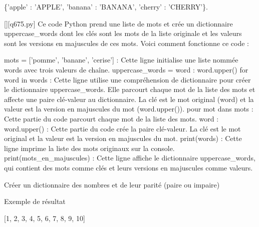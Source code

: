 \{'apple' : 'APPLE', 'banana' : 'BANANA', 'cherry' : 'CHERRY'\}.
        \par
        \begin{solution}
            \renewcommand{\nomfichier}{q675.py}
            \pythonfile{\chemincode \nomfichier}[][\nomfichier]
            Ce code Python prend une liste de mots et crée un dictionnaire uppercase_words dont les clés sont les mots de la liste originale et les valeurs sont les versions en majuscules de ces mots. Voici comment fonctionne ce code :

    mots = ['pomme', 'banane', 'cerise'] : Cette ligne initialise une liste nommée words avec trois valeurs de chaîne.
    uppercase_words = {word : word.upper() for word in words} : Cette ligne utilise une compréhension de dictionnaire pour créer le dictionnaire uppercase_words. Elle parcourt chaque mot de la liste des mots et affecte une paire clé-valeur au dictionnaire. La clé est le mot original (word) et la valeur est la version en majuscules du mot (word.upper()).
        pour mot dans mots : Cette partie du code parcourt chaque mot de la liste des mots.
        word : word.upper() : Cette partie du code crée la paire clé-valeur. La clé est le mot original et la valeur est la version en majuscules du mot.
    print(words) : Cette ligne imprime la liste des mots originaux sur la console.
    print(mots_en_majuscules) : Cette ligne affiche le dictionnaire uppercase_words, qui contient des mots comme clés et leurs versions en majuscules comme valeurs.
        \end{solution}
        

        \question
        Créer un dictionnaire des nombres et de leur parité (paire ou impaire)

Exemple de résultat

[1, 2, 3, 4, 5, 6, 7, 8, 9, 10]

